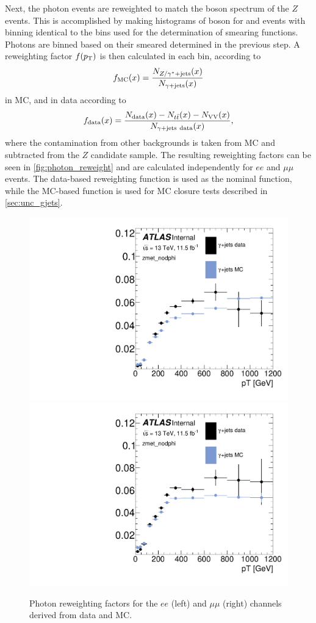 Next, the photon events are reweighted to match the boson \pt spectrum of the $Z$ events. This is accomplished by making histograms of boson \pt for \gjets and \dyjets events with binning identical to the \pt bins used for the determination of smearing functions. Photons are binned based on their smeared \pt determined in the previous step. A reweighting factor $f(p_{\text{T}})$ is then calculated in each bin, according to
%
\begin{equation}
f_\text{MC}(x) = \frac{N_{Z/\gamma^{*}+\text{jets}}(x)}{N_{\gamma+\text{jets}}(x)}
\end{equation}
%
in \ac{MC}, and in data according to
%
\begin{equation}
f_\text{data}(x) = \frac{N_{\text{data}}(x)-N_{t\bar{t}}(x)-N_{\text{VV}}(x)}{N_{\gjets\ \text{data}}(x)} ,
\end{equation}
%
where the contamination from other backgrounds is taken from \ac{MC} and subtracted from the $Z$ candidate sample. The resulting reweighting factors can be seen in \autoref{fig:photon_reweight} and are calculated independently for $ee$ and $\mu\mu$ events. The data-based reweighting function is used as the nominal function, while the \ac{MC}-based function is used for \ac{MC} closure tests described in \autoref{sec:unc_gjets}. 

\begin{centering}
\begin{figure}[!hbt]
\myfloatalign
\includegraphics[width=.45\linewidth]{figures/photons/Corr_hist_ptrw_ee_2j_2016_mcmetl_ptsmrw_smear_zmet_nodphi_.pdf}
\includegraphics[width=.45\linewidth]{figures/photons/Corr_hist_ptrw_mm_2j_2016_mcmetl_ptsmrw_smear_zmet_nodphi_.pdf}
\caption{Photon reweighting factors for the $ee$ (left) and $\mu\mu$ (right) channels derived from data and \ac{MC}.}
\label{fig:photon_reweight}
\end{figure}
\end{centering}

